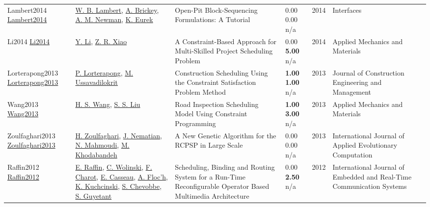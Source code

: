 {\begin{longtable}{p{3cm}p{5cm}p{10cm}p{1cm}rp{2.5cm}l}
Lambert2014 \href{http://dx.doi.org/10.1287/inte.2013.0731}{Lambert2014} & \hyperref[auth:a1556]{W. B. Lambert}, \hyperref[auth:a1557]{A. Brickey}, \hyperref[auth:a1558]{A. M. Newman}, \hyperref[auth:a1559]{K. Eurek} & Open-Pit Block-Sequencing Formulations: A Tutorial & \noindent{}\textcolor{black!50}{0.00} \textcolor{black!50}{0.00} n/a & 2014 & \cellcolor{red!20}Interfaces & \cite{Lambert2014}\\
Li2014 \href{http://dx.doi.org/10.4028/www.scientific.net/amm.681.265}{Li2014} & \hyperref[auth:a1490]{Y. Li}, \hyperref[auth:a1491]{Z. R. Xiao} & A Constraint-Based Approach for Multi-Skilled Project Scheduling Problem & \noindent{}\textcolor{black!50}{0.00} \textbf{5.00} n/a & 2014 & Applied Mechanics and Materials & \cite{Li2014}\\
Lorterapong2013 \href{http://dx.doi.org/10.1061/(asce)co.1943-7862.0000582}{Lorterapong2013} & \hyperref[auth:a1789]{P. Lorterapong}, \hyperref[auth:a1790]{M. Ussavadilokrit} & Construction Scheduling Using the Constraint Satisfaction Problem Method & \noindent{}\textbf{1.00} \textbf{1.00} n/a & 2013 & Journal of Construction Engineering and Management & \cite{Lorterapong2013}\\
Wang2013 \href{http://dx.doi.org/10.4028/www.scientific.net/amm.357-360.2720}{Wang2013} & \hyperref[auth:a1900]{H. S. Wang}, \hyperref[auth:a1901]{S. S. Liu} & Road Inspection Scheduling Model Using Constraint Programming & \noindent{}\textbf{1.00} \textbf{3.00} n/a & 2013 & Applied Mechanics and Materials & \cite{Wang2013}\\
Zoulfaghari2013 \href{http://dx.doi.org/10.4018/jaec.2013040103}{Zoulfaghari2013} & \hyperref[auth:a1755]{H. Zoulfaghari}, \hyperref[auth:a1756]{J. Nematian}, \hyperref[auth:a1757]{N. Mahmoudi}, \hyperref[auth:a1758]{M. Khodabandeh} & A New Genetic Algorithm for the RCPSP in Large Scale & \noindent{}\textcolor{black!50}{0.00} \textcolor{black!50}{0.00} n/a & 2013 & International Journal of Applied Evolutionary Computation & \cite{Zoulfaghari2013}\\
Raffin2012 \href{http://dx.doi.org/10.4018/jertcs.2012010101}{Raffin2012} & \hyperref[auth:a1529]{E. Raffin}, \hyperref[auth:a658]{C. Wolinski}, \hyperref[auth:a1530]{F. Charot}, \hyperref[auth:a1531]{E. Casseau}, \hyperref[auth:a1532]{A. Floc’h}, \hyperref[auth:a659]{K. Kuchcinski}, \hyperref[auth:a1533]{S. Chevobbe}, \hyperref[auth:a1534]{S. Guyetant} & \cellcolor{green!10}Scheduling, Binding and Routing System for a Run-Time Reconfigurable Operator Based Multimedia Architecture & \noindent{}\textcolor{black!50}{0.00} \textbf{2.50} n/a & 2012 & International Journal of Embedded and Real-Time Communication Systems & \cite{Raffin2012}\\

\end{longtable}}
